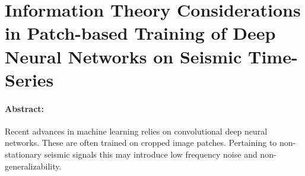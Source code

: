 \section{Information Theory Considerations in Patch-based Training of Deep Neural Networks on Seismic Time-Series}

\paragraph{Abstract:} Recent advances in machine learning relies on convolutional deep neural networks. These are often trained on cropped image patches. Pertaining to non-stationary seismic signals this may introduce low frequency noise and non-generalizability.

{\vfill\hfill\newline{}}


